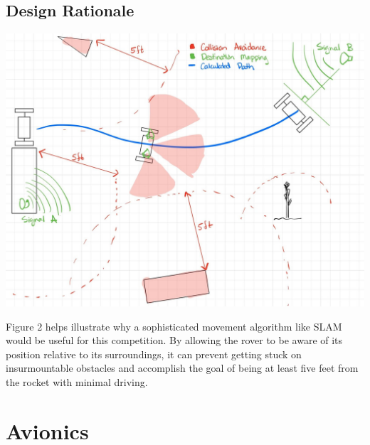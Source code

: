 \documentclass[onecolumn, draftclsnofoot,10pt, compsoc]{IEEEtran}
\begin{document}
\subsection{Design Rationale}
\begin{minipage}{\linewidth}
	\begin{center}
		\includegraphics[width=\textwidth]{ManuverDiagram}
	\end{center}
\end{minipage}
Figure 2 helps illustrate why a sophisticated movement algorithm like SLAM would be useful for this competition. By allowing the rover to be aware of its position relative to its surroundings, it can prevent getting stuck on insurmountable obstacles and accomplish the goal of being at least five feet from the rocket with minimal driving. 

\section{Avionics}
\end{document}
